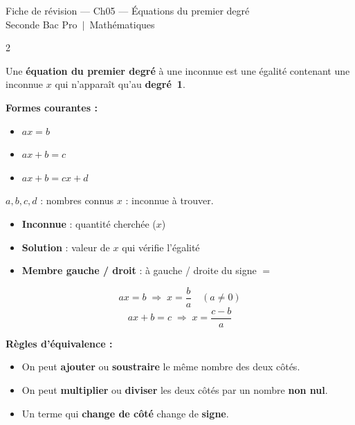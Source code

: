 \documentclass[a4paper,10pt]{article}
\begin{document}
\begin{fichetitre}
\centering Fiche de révision — Ch05 — Équations du premier degré\\[1pt]
{\normalsize\normalfont\color{white} Seconde Bac Pro \,$\vert$\, Mathématiques}
\end{fichetitre}

\vspace{4pt}

\begin{multicols}{2}

\begin{defbox}[Définition]
Une \textbf{équation du premier degré} à une inconnue est une égalité contenant une inconnue $x$ qui n'apparaît qu'au \textbf{degré~1}.

\smallskip
\textbf{Formes courantes :}
\begin{itemize}
  \item $ax = b$
  \item $ax + b = c$
  \item $ax + b = cx + d$
\end{itemize}

\smallskip
{\small $a, b, c, d$ : nombres connus \quad $x$ : inconnue à trouver.}
\end{defbox}

\vspace{4pt}

\begin{defbox}[Vocabulaire]
\begin{itemize}
  \item \textbf{Inconnue} : quantité cherchée ($x$)
  \item \textbf{Solution} : valeur de $x$ qui vérifie l'égalité
  \item \textbf{Membre gauche / droit} : à gauche / droite du signe $=$
\end{itemize}
\end{defbox}

\columnbreak

\begin{formulebox}
\[
  ax = b \;\Longrightarrow\; x = \frac{b}{a} \quad (a \neq 0)
\]
\[
  ax + b = c \;\Longrightarrow\; x = \frac{c - b}{a}
\]

\smallskip
\textbf{Règles d'équivalence :}
\begin{itemize}
  \item On peut \textbf{ajouter} ou \textbf{soustraire} le même nombre des deux côtés.
  \item On peut \textbf{multiplier} ou \textbf{diviser} les deux côtés par un nombre \textbf{non nul}.
  \item Un terme qui \textbf{change de côté} change de \textbf{signe}.
\end{itemize}
\end{formulebox}

\end{multicols}
\end{document}
